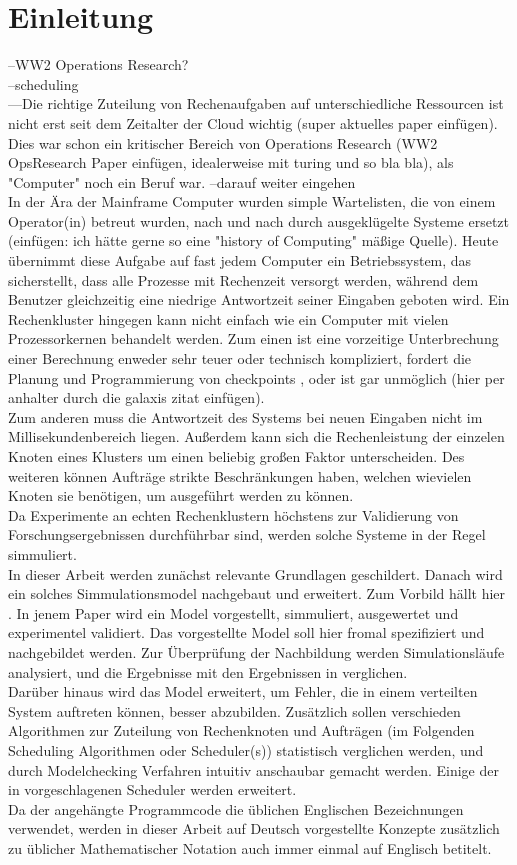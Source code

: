\chapter{Einleitung}
\label{chap:ein}


--WW2 Operations Research?\\
--scheduling\\
---Die richtige Zuteilung von Rechenaufgaben auf unterschiedliche Ressourcen ist nicht erst seit dem Zeitalter der Cloud wichtig (super aktuelles paper einfügen). Dies war schon ein kritischer Bereich von Operations Research (WW2 OpsResearch Paper einfügen, idealerweise mit turing und so bla bla), als "Computer" noch ein Beruf war.
--darauf weiter eingehen\\

In der Ära der Mainframe Computer wurden simple Wartelisten, die von einem Operator(in) betreut wurden, nach und nach durch ausgeklügelte Systeme ersetzt (einfügen: ich hätte gerne so eine "history of Computing" mäßige Quelle). Heute übernimmt diese Aufgabe auf fast jedem Computer ein Betriebssystem, das sicherstellt, dass alle Prozesse mit Rechenzeit versorgt werden, während dem Benutzer gleichzeitig eine niedrige Antwortzeit seiner Eingaben geboten wird. Ein Rechenkluster hingegen kann nicht einfach wie ein Computer mit vielen Prozessorkernen behandelt werden. Zum einen ist eine vorzeitige Unterbrechung einer Berechnung enweder sehr teuer oder technisch kompliziert, fordert die Planung und Programmierung von checkpoints \cite{IPS15}, oder ist gar unmöglich (hier per anhalter durch die galaxis zitat einfügen).\\
Zum anderen muss die Antwortzeit des Systems bei neuen Eingaben nicht im Millisekundenbereich liegen. Außerdem kann sich die Rechenleistung der einzelen Knoten eines Klusters um einen beliebig großen Faktor unterscheiden.  Des weiteren können Aufträge strikte Beschränkungen haben, welchen wievielen Knoten sie benötigen, um ausgeführt werden zu können.\\
Da Experimente an echten Rechenklustern höchstens zur Validierung von Forschungsergebnissen durchführbar sind, werden solche Systeme in der Regel simmuliert.\\
In dieser Arbeit werden zunächst relevante Grundlagen geschildert.
Danach wird ein solches Simmulationsmodel nachgebaut und erweitert. Zum Vorbild hällt hier \cite{Arn99}. In jenem Paper wird ein Model vorgestellt, simmuliert, ausgewertet und experimentel validiert. Das vorgestellte Model soll hier fromal spezifiziert und nachgebildet werden. Zur Überprüfung der Nachbildung werden Simulationsläufe analysiert, und die Ergebnisse mit den Ergebnissen in \cite{Arn99} verglichen.\\
Darüber hinaus wird das Model erweitert, um Fehler, die in einem verteilten System auftreten können, besser abzubilden.
Zusätzlich sollen verschieden Algorithmen zur Zuteilung von Rechenknoten und Aufträgen (im Folgenden Scheduling Algorithmen oder Scheduler(s)) statistisch verglichen werden, und durch Modelchecking Verfahren intuitiv anschaubar gemacht werden. Einige der in \cite{Arn99} vorgeschlagenen Scheduler werden erweitert.\\


Da der angehängte Programmcode die üblichen Englischen Bezeichnungen verwendet, werden in dieser Arbeit auf Deutsch vorgestellte Konzepte zusätzlich zu üblicher Mathematischer Notation auch immer einmal auf Englisch betitelt.


